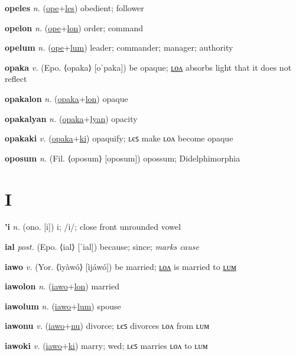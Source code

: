 \textbf{\hypertarget{opeles}{opeles}} \textit{n.} (\hyperlink{ope}{ope}+\allowbreak \hyperlink{les}{les})
obedient; follower

\textbf{\hypertarget{opelon}{opelon}} \textit{n.} (\hyperlink{ope}{ope}+\allowbreak \hyperlink{lon}{lon})
order; command

\textbf{\hypertarget{opelum}{opelum}} \textit{n.} (\hyperlink{ope}{ope}+\allowbreak \hyperlink{lum}{lum})
leader; commander; manager; authority

\textbf{\hypertarget{opaka}{opaka}} \textit{v.} (Epo. ⟨opaka⟩ [oˈpaka])
be opaque; \hyperlink{opakalon}{ʟᴏᴧ} absorbs light that it does not reflect

\textbf{\hypertarget{opakalon}{opakalon}} \textit{n.} (\hyperlink{opaka}{opaka}+\allowbreak \hyperlink{lon}{lon})
opaque

\textbf{\hypertarget{opakalyan}{opakalyan}} \textit{n.} (\hyperlink{opaka}{opaka}+\allowbreak \hyperlink{lyan}{lyan})
opacity

\textbf{\hypertarget{opakaki}{opakaki}} \textit{v.} (\hyperlink{opaka}{opaka}+\allowbreak \hyperlink{ki}{ki})
opaquify; ʟєꜱ make ʟᴏᴧ become opaque

\textbf{\hypertarget{oposum}{oposum}} \textit{n.} (Fil. ⟨oposum⟩ [oposum])
opossum; Didelphimorphia

\section{I}

\textbf{\hypertarget{'i}{'i}} \textit{n.} (ono. [i])
i; /i/; close front unrounded vowel

\textbf{\hypertarget{ial}{ial}} \textit{post.} (Epo. ⟨ial⟩ [ˈial])
because; since; \textit{marks cause}

\textbf{\hypertarget{iawo}{iawo}} \textit{v.} (Yor. ⟨ìyàwó⟩ [ìjáwó])
be married; \hyperlink{iawolon}{ʟᴏᴧ} is married to \hyperlink{iawolum}{ʟᴜᴍ}

\textbf{\hypertarget{iawolon}{iawolon}} \textit{n.} (\hyperlink{iawo}{iawo}+\allowbreak \hyperlink{lon}{lon})
married

\textbf{\hypertarget{iawolum}{iawolum}} \textit{n.} (\hyperlink{iawo}{iawo}+\allowbreak \hyperlink{lum}{lum})
spouse

\textbf{\hypertarget{iawonu}{iawonu}} \textit{v.} (\hyperlink{iawo}{iawo}+\allowbreak \hyperlink{nu}{nu})
divorce; ʟєꜱ divorces ʟᴏᴧ from ʟᴜᴍ

\textbf{\hypertarget{iawoki}{iawoki}} \textit{v.} (\hyperlink{iawo}{iawo}+\allowbreak \hyperlink{ki}{ki})
marry; wed; ʟєꜱ marries ʟᴏᴧ to ʟᴜᴍ

